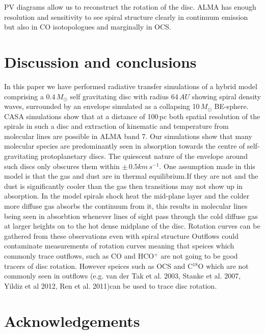 \documentclass[useAMS,usenatbib]{mn2e}
\begin{document}
PV diagrams allow us to reconstruct the rotation of the disc. ALMA has enough resolution and sensitivity to see spiral structure clearly in continuum emission but also in CO isotopologues and marginally in OCS.


\section{Discussion and conclusions} \label{sec:discussion}

In this paper we have performed radiative transfer simulations of a hybrid model comprising a 0.4$\, M_\odot$ self gravitating disc with radius 64$\,AU$ showing spiral density waves, surrounded by an envelope simulated as a collapsing 10$\,M_\odot$ BE-sphere. CASA simulations show that at a distance of 100$\,$pc both spatial resolution of the spirals in such a disc and extraction of kinematic and temperature from molecular lines are possible in ALMA band 7. Our simulations show that many  molecular species are predominantly seen in absorption towards the centre of  self-gravitating protoplanetary discs. The quiescent nature of the envelope around such discs only obscures them within $\pm\,0.5 km\,s^{-1}$.\newline
One assumption made in this model is that the gas and dust are in thermal equilibrium.If they are not and the dust is significantly cooler than the gas then transitions may not show up in absorption.\newline
In the model spirals shock heat the mid-plane layer and the colder more diffuse gas absorbs the continuum from it, this results in molecular lines being seen in absorbtion whenever lines of sight pass through the cold diffuse gas at larger heights on to the hot dense midplane of the disc. Rotation curves can be gathered from these observations even with spiral structure\newline
Outflows could contaminate measurements of rotation curves meaning that speices  which commonly trace outflows, such as CO and HCO$^+$ are not going to be good tracers of disc rotation. However speices such as OCS and C$^{18}$O which are not commonly seen in outflows (e.g. van der Tak et al. 2003, Stanke et al. 2007, Yildiz et al 2012, Ren et al. 2011)can be used to trace disc rotation.


\section*{Acknowledgements}
\end{document}
